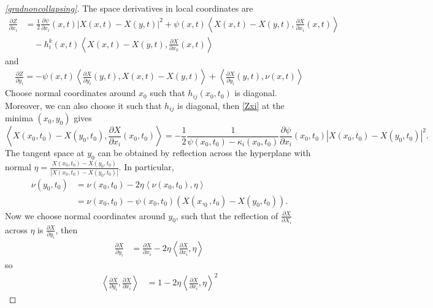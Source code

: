 \begin{proof}[\cref{gradnoncollapsing}]
    The space derivatives in local coordinates are 
    \begin{align}
        \frac{\partial Z}{ \partial x_{i}}  & =  \frac{1}{2} \frac{\partial \psi}{\partial x_{i}}(x,t)|X(x,t) - X(y,t)|^{2} + \psi(x,t)\left< X(x,t)-X(y,t), \frac{\partial X}{\partial x_{i}}(x,t) \right> \nonumber \\
        & \quad - h_{i}^{k}(x,t)\left< X(x,t)-X(y,t), \frac{\partial X}{\partial x_{k}}(x,t) \right> \label{Zxi}
    \end{align}
    and \begin{align}
        \frac{\partial Z}{\partial y_{i}} = - \psi(x,t)\left< \frac{\partial X}{\partial y_{i}}(y,t), X(x,t) - X(y,t) \right> + \left< \frac{\partial X}{\partial y_{i}}(y,t) , \nu(x,t)\right> \label{Zyi}
    \end{align}
    Choose normal coordinates around $ x_{0} $ such that $ h_{ij}(x_{0},t_{0}) $ is diagonal. Moreover, we can also choose it such that $ h_{ij} $ is diagonal, then \cref{Zxi} at the minima $ (x_{0},y_{0}) $ gives
    \begin{equation}
        \left< X(x_{0},t_{0})-X(y_{0},t_{0}), \frac{\partial X}{\partial x_{i}}(x_{0},t_{0}) \right> = -\frac{1}{2} \frac{1}{\psi(x_{0},t_{0})-\kappa_{i}(x_{0},t_{0})} \frac{\partial \psi}{\partial x_{i}}(x_{0},t_{0}) |X(x_{0},t_{0})-X(y_{0},t_{0})|^{2}.
    \end{equation}
    The tangent space at $ y_{0} $ can be obtained by reflection across the hyperplane with normal $ \eta = \frac{X(x_{0},t_{0})-X(y_{0},t_{0})}{|X(x_{0},t_{0})-X(y_{0},t_{0})|} $. In particular, \begin{align}
        \nu(y_{0},t_{0}) &= \nu(x_{0},t_{0}) - 2 \eta \left< \nu(x_{0},t_{0}), \eta \right> \nonumber\\ 
        & = \nu(x_{0},t_{0}) - \psi(x_{0},t_{0})(X(x,_{0},t_{0})-X(y_{0},t_{0})).
    \end{align}
    Now we choose normal coordinates around $ y_{0} $, such that the reflection of $ \frac{\partial X}{\partial X_{i}} $ across $ \eta $ is $ \frac{\partial X}{\partial y_{i}} $, then \begin{align}
        \frac{\partial X}{\partial y_{i}} & = \frac{\partial X}{\partial x_{i}} - 2 \eta \left< \frac{\partial X}{\partial x_{i}}, \eta \right>
    \end{align}
    so \begin{align*}
        \left< \frac{\partial X}{\partial y_{i}}, \frac{\partial X}{\partial x_{i}} \right> & = 1-2 \eta \left< \frac{\partial X}{\partial x_{i}}, \eta \right>^{2}
    \end{align*}



\end{proof}
